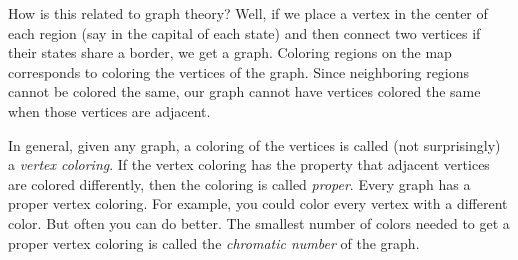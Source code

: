 \documentclass[12pt]{article}
\begin{document}
How is this related to graph theory?  Well, if we place a vertex in the center of each region (say in the capital of each state) and then connect two vertices if their states share a border, we get a graph.  Coloring regions on the map corresponds to coloring the vertices of the graph.  Since neighboring regions cannot be colored the same, our graph cannot have vertices colored the same when those vertices are adjacent.

In general, given any graph, a coloring of the vertices is called (not surprisingly) a \emph{vertex coloring}.  If the vertex coloring has the property that adjacent vertices are colored differently, then the coloring is called \emph{proper}.  Every graph has a proper vertex coloring.  For example, you could color every vertex with a different color.  But often you can do better.  The smallest number of colors needed to get a proper vertex coloring is called the \emph{chromatic number} of the graph.
\end{document}
